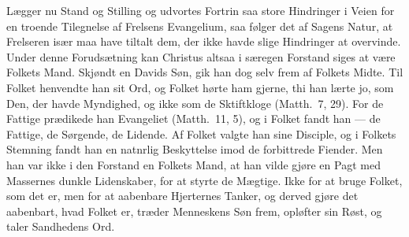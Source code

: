 \documentclass[12pt,a4paper]{book}
\begin{document}
Lægger nu Stand og Stilling og udvortes Fortrin saa store Hindringer i Veien for en
troende Tilegnelse af Frelsens Evangelium, saa følger det af Sagens Natur, at Frelseren
især maa have tiltalt dem, der ikke havde slige Hindringer at overvinde. Under denne
Forudsætning kan Christus altsaa i særegen Forstand siges at være Folkets Mand. Skjøndt en
Davids Søn, gik han dog selv frem af Folkets Midte. Til Folket henvendte han sit Ord, og
Folket hørte ham gjerne, thi han lærte jo, som Den, der havde Myndighed, og ikke som de
Sktiftkloge (Matth.\ 7, 29). For de Fattige prædikede han Evangeliet (Matth.\ 11, 5), og i
Folket fandt han --- de Fattige, de Sørgende, de Lidende. Af Folket valgte han sine
Disciple, og i Folkets Stemning fandt han en natnrlig Beskyttelse imod de forbittrede
Fiender. Men han var ikke i den Forstand en Folkets Mand, at han vilde gjøre en Pagt med
Massernes dunkle Lidenskaber, for at styrte de Mægtige. Ikke for at bruge Folket, som det
er, men for at aabenbare Hjerternes Tanker, og derved gjøre det aabenbart, hvad Folket er,
træder Menneskens Søn frem, opløfter sin Røst, og taler Sandhedens Ord.
\end{document}

